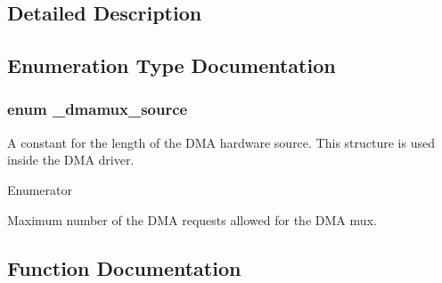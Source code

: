 \subsection{Detailed Description}


\subsection{Enumeration Type Documentation}
\subsubsection[{\texorpdfstring{\+\_\+dmamux\+\_\+source}{_dmamux_source}}]{\setlength{\rightskip}{0pt plus 5cm}enum {\bf \+\_\+dmamux\+\_\+source}}\hypertarget{group__dmamux__hal_gace5f1036af4e69333fb490b030de1112}{}\label{group__dmamux__hal_gace5f1036af4e69333fb490b030de1112}


A constant for the length of the D\+MA hardware source. This structure is used inside the D\+MA driver. 

\begin{Desc}
\item[Enumerator]\par
\begin{description}
\item[{\em 
k\+Dmamux\+Dma\+Request\+Source\hypertarget{group__dmamux__hal_ggace5f1036af4e69333fb490b030de1112a5424bc0aed5209b8d1c2bfe8783f87d1}{}\label{group__dmamux__hal_ggace5f1036af4e69333fb490b030de1112a5424bc0aed5209b8d1c2bfe8783f87d1}
}]Maximum number of the D\+MA requests allowed for the D\+MA mux. \end{description}
\end{Desc}


\subsection{Function Documentation}
